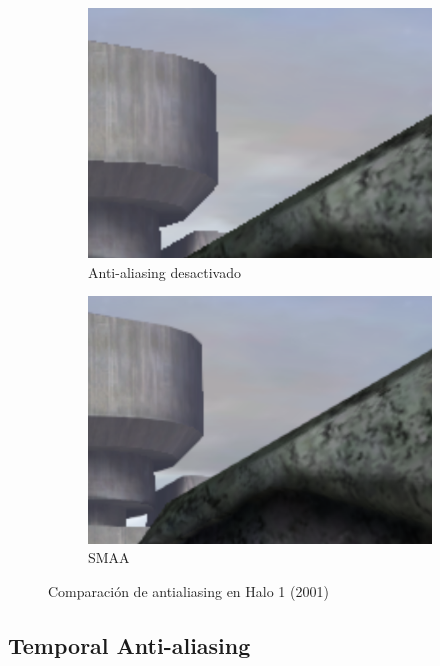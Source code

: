 \documentclass[withindex, glossary]{cam-thesis}
\begin{document}
\begin{figure}[!htbp]
    \centering
    \begin{subfigure}[b]{0.8\textwidth}
        \includegraphics[width=\textwidth]{figures/smaaOFF.png}
        \caption{Anti-aliasing desactivado}
    \end{subfigure}
    \centering
    \begin{subfigure}[b]{0.8\textwidth}
        \includegraphics[width=\textwidth]{figures/smaaON.png}
        \caption{SMAA}
    \end{subfigure}
    \caption{Comparación de antialiasing en Halo 1 (2001)\label{halo1}}
\end{figure}

\subsection{Temporal Anti-aliasing}
\end{document}
